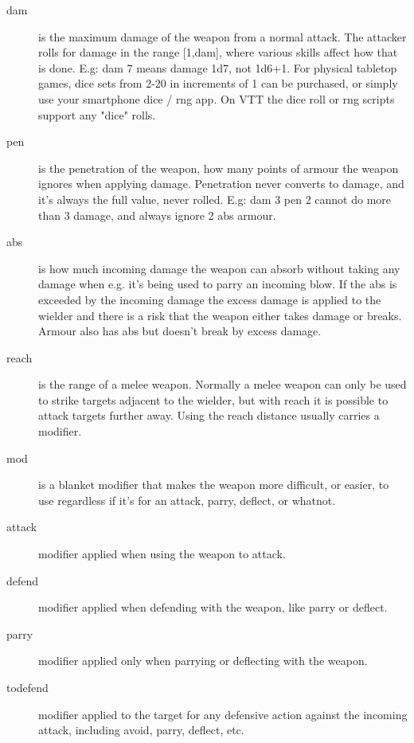 \begin{description}

\item[dam] is the maximum damage of the weapon from a normal attack. The attacker rolls for damage in the range [1,dam], where various skills affect how that is done. E.g: dam 7 means damage 1d7, not 1d6+1. For physical tabletop games, dice sets from 2-20 in increments of 1 can be purchased, or simply use your smartphone dice / rng app. On VTT the dice roll or rng scripts support any "dice" rolls.

\item[pen] is the penetration of the weapon, how many points of armour the weapon ignores when applying damage. Penetration never converts to damage, and it's always the full value, never rolled. E.g: dam 3 pen 2 cannot do more than 3 damage, and always ignore 2 abs armour.

\item[abs] is how much incoming damage the weapon can absorb without taking any damage when e.g. it's being used to parry an incoming blow. If the abs is exceeded by the incoming damage the excess damage is applied to the wielder and there is a risk that the weapon either takes damage or breaks. Armour also has abs but doesn't break by excess damage.

\item[reach] is the range of a melee weapon. Normally a melee weapon can only be used to strike targets adjacent to the wielder, but with reach it is possible to attack targets further away. Using the reach distance usually carries a modifier.

\item[mod] is a blanket modifier that makes the weapon more difficult, or easier, to use regardless if it's for an attack, parry, deflect, or whatnot.

\item[attack] modifier applied when using the weapon to attack.

\item[defend] modifier applied when defending with the weapon, like parry or deflect.

\item[parry] modifier applied only when parrying or deflecting with the weapon.

\item[todefend] modifier applied to the target for any defensive action against the incoming attack, including avoid, parry, deflect, etc.


\end{description}
